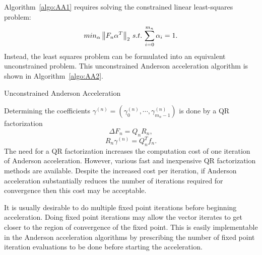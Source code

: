Algorithm~\ref{algo:AA1} requires solving the constrained linear least-squares problem:
\begin{equation}
	min_{\alpha} \left\lVert F_{n} \alpha^{T}\right\rVert_{2} \, s.t.\, \sum_{i=0}^{m_{n}} \alpha_{i} = 1.
\end{equation}
Instead, the least squares problem can be formulated \cite{anderson1965iterative} into an equivalent unconstrained problem. This unconstrained Anderson acceleration algorithm is shown in Algorithm~\ref{algo:AA2}.

\clearpage

\begin{algorithm}[!htbp]
	\caption{Unconstrained Anderson Acceleration}
	\label{algo:AA2}
	\begin{algorithmic}
		\ENDFOR
	\end{algorithmic}
\end{algorithm}
Determining the coefficients $\gamma^{(n)} = (\gamma_{0}^{(n)}, \cdots, \gamma_{m_{n}-1}^{(n)})$ is done by a QR factorization
\begin{equation}
	\Delta F_{n} = Q_{n}R_{n},
\end{equation}
\begin{equation}
	R_{n} \gamma^{(n)} = Q_{n}^{T}f_{n}.
\end{equation}
The need for a QR factorization increases the computation cost of one iteration of Anderson acceleration. However, various fast and inexpensive QR factorization methods are available. Despite the increased cost per iteration, if Anderson acceleration substantially reduces the number of iterations required for convergence then this cost may be acceptable.

It is usually desirable to do multiple fixed point iterations before beginning acceleration. Doing fixed point iterations may allow the vector iterates to get closer to the region of convergence of the fixed point. This is easily implementable in the Anderson acceleration algorithms by prescribing the number of fixed point iteration evaluations to be done before starting the acceleration.

